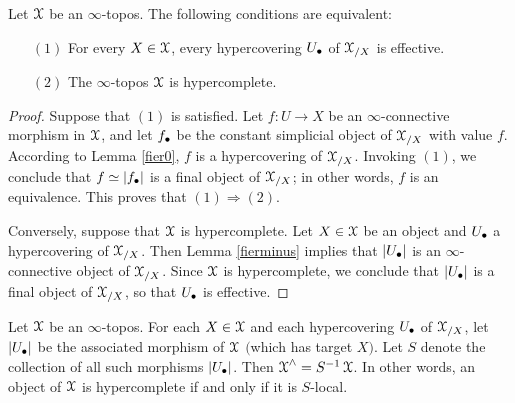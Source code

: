 \begin{theorem}\label{surp}
Let $\operatorname{\mathcal{X}}$ be an $\infty$-topos. The following conditions are equivalent:
\begin{itemize}
\item[$(1)$] For every $X \in \operatorname{\mathcal{X}}$, every hypercovering $U_{\bullet}$ of
$\operatorname{\mathcal{X}}_{/X}$ is effective.
\item[$(2)$] The $\infty$-topos $\operatorname{\mathcal{X}}$ is hypercomplete.
\end{itemize}
\end{theorem}

\begin{proof}
Suppose that $(1)$ is satisfied. Let $f: U \rightarrow X$ be an $\infty$-connective morphism in $\operatorname{\mathcal{X}}$, and let $f_{\bullet}$ be the constant simplicial object of $\operatorname{\mathcal{X}}_{/X}$ with value $f$.
According to Lemma \ref{fier0}, $f$ is a hypercovering of $\operatorname{\mathcal{X}}_{/X}$. Invoking $(1)$, we conclude that $f \simeq | f_{\bullet} |$ is a final object of $\operatorname{\mathcal{X}}_{/X}$; in other words, $f$ is an equivalence. This proves that $(1) \Rightarrow (2)$.

Conversely, suppose that $\operatorname{\mathcal{X}}$ is hypercomplete. Let $X \in \operatorname{\mathcal{X}}$ be an object and
$U_{\bullet}$ a hypercovering of $\operatorname{\mathcal{X}}_{/X}$. Then Lemma \ref{fierminus} implies that
$| U_{\bullet} |$ is an $\infty$-connective object of $\operatorname{\mathcal{X}}_{/X}$. Since $\operatorname{\mathcal{X}}$ is hypercomplete, we conclude that $|U_{\bullet}|$ is a final object of $\operatorname{\mathcal{X}}_{/X}$, so that $U_{\bullet}$ is effective.
\end{proof}

\begin{corollary}\label{charhyp}
Let $\operatorname{\mathcal{X}}$ be an $\infty$-topos. For each $X \in \operatorname{\mathcal{X}}$ and each hypercovering
$U_{\bullet}$ of $\operatorname{\mathcal{X}}_{/X}$, let $|U_{\bullet}|$ be the associated morphism of $\operatorname{\mathcal{X}}$
$(${}which has target $X${}$)$. 
Let $S$ denote the collection of all such morphisms $|U_{\bullet}|$. Then
$\operatorname{\mathcal{X}}^{\wedge} = S^{-1} \operatorname{\mathcal{X}}$. In other words, an object of
$\operatorname{\mathcal{X}}$ is hypercomplete if and only if it is $S$-local.
\end{corollary}

